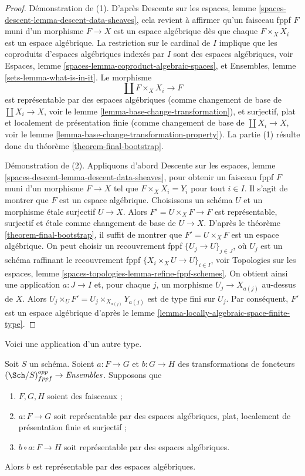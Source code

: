 \begin{proof}
Démonstration de (1). D'après
Descente sur les espaces, lemme \ref{spaces-descent-lemma-descent-data-sheaves},
cela revient à affirmer qu'un faisceau fppf $F$
muni d'un morphisme $F \to X$ est un espace algébrique dès que
chaque $F \times_X X_i$ est un espace algébrique.
La restriction sur le cardinal de $I$ implique que
les coproduits d'espaces algébriques indexés par $I$ sont des espaces algébriques, voir
Espaces, lemme \ref{spaces-lemma-coproduct-algebraic-spaces},
et
Ensembles, lemme \ref{sets-lemma-what-is-in-it}.
Le morphisme
$$
\coprod F \times_X X_i \longrightarrow F
$$
est représentable par des espaces algébriques (comme changement de base de
$\coprod X_i \to X$, voir le lemme \ref{lemma-base-change-transformation}),
et surjectif, plat et localement de présentation finie
(comme changement de base de $\coprod X_i \to X$, voir le
lemme \ref{lemma-base-change-transformation-property}).
La partie (1) résulte donc du théorème \ref{theorem-final-bootstrap}.

\medskip\noindent
Démonstration de (2). Appliquons d'abord
Descente sur les espaces, lemme \ref{spaces-descent-lemma-descent-data-sheaves},
pour obtenir un faisceau fppf $F$ muni d'un morphisme $F \to X$
tel que $F \times_X X_i = Y_i$ pour tout $i \in I$.
Il s'agit de montrer que $F$ est un espace algébrique.
Choisissons un schéma $U$ et un morphisme étale surjectif $U \to X$.
Alors $F' = U \times_X F \to F$ est représentable, surjectif et étale
comme changement de base de $U \to X$.
D'après le théorème \ref{theorem-final-bootstrap}, il suffit de montrer
que $F' = U \times_X F$ est un espace algébrique.
On peut choisir un recouvrement fppf $\{U_j \to U\}_{j \in J}$,
où $U_j$ est un schéma raffinant le recouvrement fppf
$\{X_i \times_X U \to U\}_{i \in I}$, voir
Topologies sur les espaces, lemme
\ref{spaces-topologies-lemma-refine-fppf-schemes}.
On obtient ainsi une application $a : J \to I$ et, pour chaque $j$,
un morphisme $U_j \to X_{a(j)}$ au-dessus de $X$.
Alors $U_j \times_U F' = U_j \times_{X_{a(j)}} Y_{a(j)}$
est de type fini sur $U_j$. Par conséquent, $F'$ est un espace
algébrique d'après le lemme \ref{lemma-locally-algebraic-space-finite-type}.
\end{proof}

\noindent
Voici une application d'un autre type.

\begin{lemma}
\label{lemma-representable-by-spaces-cover}
Soit $S$ un schéma. Soient $a : F \to G$ et $b : G \to H$ des
transformations de foncteurs $(\Sch/S)_{fppf}^{opp} \to \textit{Ensembles}$.
Supposons que
\begin{enumerate}
\item $F, G, H$ soient des faisceaux ;
\item $a : F \to G$ soit représentable par des espaces algébriques, plat,
localement de présentation finie et surjectif ;
\item $b \circ a : F \to H$ soit représentable par des espaces algébriques.
\end{enumerate}
Alors $b$ est représentable par des espaces algébriques.
\end{lemma}

